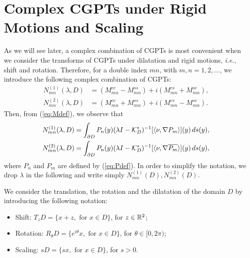 \section{Complex CGPTs under Rigid Motions and Scaling}\label{sec:complex-cgpt-under}
As we will see later, a complex combination of CGPTs is most
convenient when we consider the transforms of CGPTs under
dilatation and rigid motions, \emph{i.e.}, shift and rotation.
Therefore, for a double index $mn$, with $m,n=1,2,\ldots$, we
introduce the following complex combination of CGPTs:
\begin{equation}
\begin{aligned}
N_{mn}^{(1)}(\lambda, D) &= (M^{cc}_{mn} - M^{ss}_{mn}) +
i(M^{cs}_{mn} + M^{sc}_{mn}),\\
N_{mn}^{(2)}(\lambda, D) &= (M^{cc}_{mn} + M^{ss}_{mn}) +
i(M^{cs}_{mn} - M^{sc}_{mn}).
\end{aligned}
\label{eq:Mccdef}
\end{equation}
Then, from (\ref{eq:Mdef}),  we observe that
\begin{equation*}
\begin{aligned}
N_{mn}^{(1)}(\lambda, D) &= \int_{\partial D} P_n(y)  (\lambda
I - \mathcal{K}^*_{D})^{-1}[\langle \nu, \nabla P_m \rangle](y)\,
ds(y),\\
N_{mn}^{(2)}(\lambda, D) &= \int_{\partial D} P_n(y)  (\lambda
I - \mathcal{K}^*_{D})^{-1}[\langle \nu, \nabla \overline{P_m} \rangle] (y) \, ds(y),\\
\end{aligned}
\end{equation*}
where $P_n$ and $P_m$ are defined by (\ref{eq:Pdef}). In order to
simplify the notation, we drop $\lambda$ in the following and
write simply $N_{mn}^{(1)}(D), N_{mn}^{(2)}(D)$.

We consider the translation, the rotation and the dilatation of
the domain $D$ by
 introducing the following notation:

\begin{itemize}
\item Shift: $T_zD = \{x+z, \mbox{ for } x\in D\}$, for $z \in
\R^2$; \item Rotation: $R_\theta D = \{e^{i\theta}x, \mbox{ for }
x\in D\}$, for $\theta\in[0,2\pi)$; \item Scaling: $sD=\{sx,
\mbox{ for } x\in D\}$, for $s>0$.
\end{itemize}

